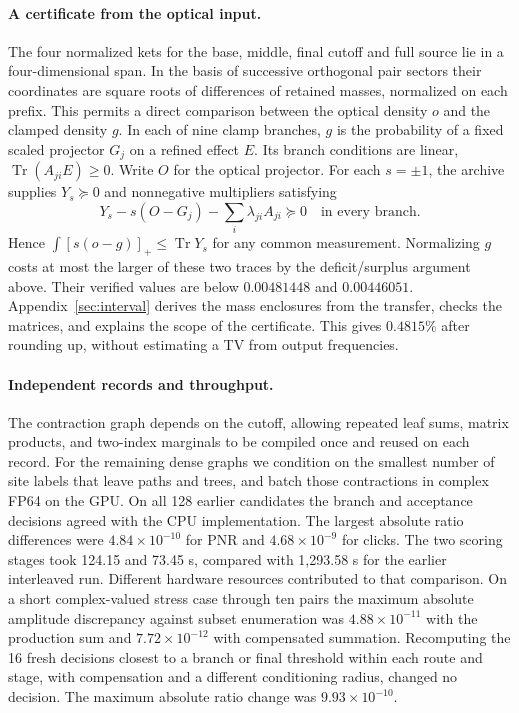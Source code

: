 \documentclass[11pt]{article}
\newcommand{\tr}{\operatorname{Tr}}
\begin{document}
\paragraph{A certificate from the optical input.}
The four normalized kets for the base, middle, final cutoff and full source lie in a four-dimensional span. In the basis of successive orthogonal pair sectors their coordinates are square roots of differences of retained masses, normalized on each prefix. This permits a direct comparison between the optical density $o$ and the clamped density $g$. In each of nine clamp branches, $g$ is the probability of a fixed scaled projector $G_j$ on a refined effect $E$. Its branch conditions are linear, $\tr(A_{ji}E)\ge0$. Write $O$ for the optical projector. For each $s=\pm1$, the archive supplies $Y_s\succeq0$ and nonnegative multipliers satisfying
\[
Y_s-s(O-G_j)-\sum_i\lambda_{ji} A_{ji}\succeq0
\quad\text{in every branch.}
\]
Hence $\int[s(o-g)]_+\le\tr Y_s$ for any common measurement. Normalizing $g$ costs at most the larger of these two traces by the deficit/surplus argument above. Their verified values are below $0.00481448$ and $0.00446051$. Appendix~\ref{sec:interval} derives the mass enclosures from the transfer, checks the matrices, and explains the scope of the certificate. This gives $0.4815\%$ after rounding up, without estimating a TV from output frequencies.

\paragraph{Independent records and throughput.}
The contraction graph depends on the cutoff, allowing repeated leaf sums, matrix products, and two-index marginals to be compiled once and reused on each record. For the remaining dense graphs we condition on the smallest number of site labels that leave paths and trees, and batch those contractions in complex FP64 on the GPU. On all 128 earlier candidates the branch and acceptance decisions agreed with the CPU implementation. The largest absolute ratio differences were $4.84\times10^{-10}$ for PNR and $4.68\times10^{-9}$ for clicks. The two scoring stages took 124.15 and 73.45 s, compared with 1,293.58 s for the earlier interleaved run. Different hardware resources contributed to that comparison. On a short complex-valued stress case through ten pairs the maximum absolute amplitude discrepancy against subset enumeration was $4.88\times10^{-11}$ with the production sum and $7.72\times10^{-12}$ with compensated summation. Recomputing the 16 fresh decisions closest to a branch or final threshold within each route and stage, with compensation and a different conditioning radius, changed no decision. The maximum absolute ratio change was $9.93\times10^{-10}$.
\end{document}
